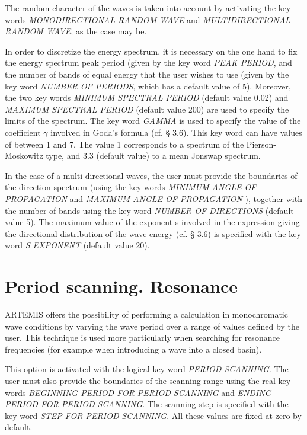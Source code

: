 The random character of the waves is taken into account by activating the key
words \textit{MONODIRECTIONAL RANDOM WAVE} and \textit{MULTIDIRECTIONAL RANDOM
WAVE}, as the case may be.

In order to discretize the energy spectrum, it is necessary on the one hand to
fix the energy spectrum peak period (given by the key word \textit{PEAK
PERIOD}, and the number of bands of equal energy that the user
wishes to use (given by the key word \textit{NUMBER OF
PERIODS}, which has a default value of 5). Moreover, the two key words
\textit{MINIMUM SPECTRAL PERIOD} (default value 0.02)
and \textit{MAXIMUM SPECTRAL PERIOD} (default value 200)
are used to specify the limits of the spectrum. The key word
\textit{GAMMA} is used to specify the value of the coefficient $\gamma$
involved in Goda's formula (cf. {\S} 3.6). This key word can have values of
between 1 and 7. The value 1 corresponds to a spectrum of the
Pierson-Moskowitz type, and 3.3 (default value) to a mean Jonswap spectrum.

In the case of a multi-directional waves, the user must provide the boundaries
of the direction spectrum (using the key words \textit{MINIMUM ANGLE OF
PROPAGATION} and \textit{MAXIMUM ANGLE OF PROPAGATION} ), together with the
number of bands using the key word \textit{NUMBER OF DIRECTIONS} (default value
5). The maximum value of the exponent s involved in the expression giving the
directional distribution of the wave energy (cf. {\S} 3.6) is specified with
the key word \textit{S EXPONENT} (default value 20).


\section{Period scanning. Resonance}

ARTEMIS offers the possibility of performing a calculation in monochromatic
wave conditions by varying the wave period over a range of values defined by
the user. This technique is used more particularly when searching for resonance
frequencies (for example when introducing a wave into a closed basin).

This option is activated with the logical key word \textit{PERIOD SCANNING}.
The user must also provide the boundaries of the scanning range using the real
key words \textit{BEGINNING PERIOD FOR PERIOD SCANNING} and \textit{ENDING
PERIOD FOR PERIOD SCANNING}. The scanning step is specified with the key word
\textit{STEP FOR PERIOD SCANNING}. All these values are fixed at zero by
default.


